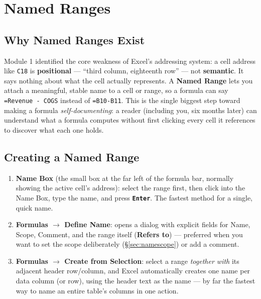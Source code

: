 \documentclass[11pt,a4paper]{article}
\newcommand{\key}[1]{\texttt{\colorbox{black!8}{\textbf{#1}}}}
\begin{document}
\section{Named Ranges}
\label{sec:namedranges}

\subsection{Why Named Ranges Exist}

\begin{keyconcept}
Module 1 identified the core weakness of Excel's addressing system: a cell address like \texttt{C18} is \textbf{positional} --- ``third column, eighteenth row'' --- not \textbf{semantic}. It says nothing about what the cell actually represents. A \textbf{Named Range} lets you attach a meaningful, stable name to a cell or range, so a formula can say \texttt{=Revenue - COGS} instead of \texttt{=B10-B11}. This is the single biggest step toward making a formula \emph{self-documenting}: a reader (including you, six months later) can understand what a formula computes without first clicking every cell it references to discover what each one holds.
\end{keyconcept}

\subsection{Creating a Named Range}

\begin{formulasyntax}
\begin{enumerate}
  \item \textbf{Name Box} (the small box at the far left of the formula bar, normally showing the active cell's address): select the range first, then click into the Name Box, type the name, and press \key{Enter}. The fastest method for a single, quick name.
  \item \textbf{Formulas $\rightarrow$ Define Name}: opens a dialog with explicit fields for Name, Scope, Comment, and the range itself (\textbf{Refers to}) --- preferred when you want to set the scope deliberately (\S\ref{sec:namescope}) or add a comment.
  \item \textbf{Formulas $\rightarrow$ Create from Selection}: select a range \emph{together with} its adjacent header row/column, and Excel automatically creates one name per data column (or row), using the header text as the name --- by far the fastest way to name an entire table's columns in one action.
\end{enumerate}
\end{formulasyntax}
\end{document}

